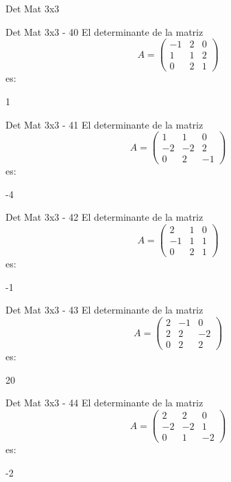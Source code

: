 \documentclass[a4,11pt]{aleph-notas}
\begin{document}
\begin{quiz}{Det Mat 3x3}
\begin{numerical}[tolerance=0]%
    {Det Mat 3x3 - 40}
    El determinante de la matriz
    \[
        A = \begin{pmatrix} -1 & 2 & 0 \\ 1 & 1 & 2 \\ 0 & 2 & 1 \end{pmatrix}
    \]
    es:
    \item[] 1
\end{numerical}

\begin{numerical}[tolerance=0]%
    {Det Mat 3x3 - 41}
    El determinante de la matriz
    \[
        A = \begin{pmatrix} 1 & 1 & 0 \\ -2 & -2 & 2 \\ 0 & 2 & -1 \end{pmatrix}
    \]
    es:
    \item[] -4
\end{numerical}

\begin{numerical}[tolerance=0]%
    {Det Mat 3x3 - 42}
    El determinante de la matriz
    \[
        A = \begin{pmatrix} 2 & 1 & 0 \\ -1 & 1 & 1 \\ 0 & 2 & 1 \end{pmatrix}
    \]
    es:
    \item[] -1
\end{numerical}

\begin{numerical}[tolerance=0]%
    {Det Mat 3x3 - 43}
    El determinante de la matriz
    \[
        A = \begin{pmatrix} 2 & -1 & 0 \\ 2 & 2 & -2 \\ 0 & 2 & 2 \end{pmatrix}
    \]
    es:
    \item[] 20
\end{numerical}

\begin{numerical}[tolerance=0]%
    {Det Mat 3x3 - 44}
    El determinante de la matriz
    \[
        A = \begin{pmatrix} 2 & 2 & 0 \\ -2 & -2 & 1 \\ 0 & 1 & -2 \end{pmatrix}
    \]
    es:
    \item[] -2
\end{numerical}


\end{quiz}
\end{document}
